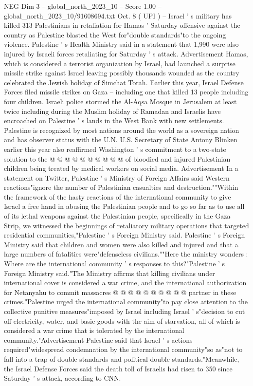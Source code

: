 \begin{textsample}{NEG Dim 3 – global\_north\_2023\_10 – Score 1.00 – global\_north\_2023\_10/91608694.txt}  \label{ex:f3_neg_187}
Oct. 8 ( UPI ) -- Israel ' s military has killed 313 Palestinians in retaliation for Hamas ' Saturday offensive against the country as Palestine blasted the West for"double standards"to the ongoing violence.
Palestine ' s Health Ministry said in a statement that 1,990 were also injured by Israeli forces retaliating for Saturday ' s attack.
Advertisement Hamas, which is considered a terrorist organization by Israel, had launched a surprise missile strike against Israel leaving possibly thousands wounded as the country celebrated the Jewish holiday of Simchat Torah.
Earlier this year, Israel Defense Forces filed missile strikes on Gaza -- including one that killed 13 people including four children.
Israeli police stormed the Al-Aqsa Mosque in Jerusalem at least twice including during the Muslim holiday of Ramadan and Israelis have encroached on Palestine ' s lands in the West Bank with new settlements.
Palestine is recognized by most nations around the world as a sovereign nation and has observer status with the U.N.
U.S.
Secretary of State Antony Blinken earlier this year also reaffirmed Washington ' s commitment to a two-state solution to the @ @ @ @ @ @ @ @ @ @ of bloodied and injured Palestinian children being treated by medical workers on social media.
Advertisement In a statement on Twitter, Palestine ' s Ministry of Foreign Affairs said Western reactions"ignore the number of Palestinian casualties and destruction.""Within the framework of the hasty reactions of the international community to give Israel a free hand in abusing the Palestinian people and to go so far as to use all of its lethal weapons against the Palestinian people, specifically in the Gaza Strip, we witnessed the beginnings of retaliatory military operations that targeted residential communities,"Palestine ' s Foreign Ministry said.
Palestine ' s Foreign Ministry said that children and women were also killed and injured and that a large numbers of fatalities were"defenseless civilians.""Here the ministry wonders : Where are the international community ' s responses to this?"Palestine ' s Foreign Ministry said."The Ministry affirms that killing civilians under international cover is considered a war crime, and the international authorization for Netanyahu to commit massacres @ @ @ @ @ @ @ @ @ @ partner in these crimes."Palestine urged the international community"to pay close attention to the collective punitive measures"imposed by Israel including Israel ' s"decision to cut off electricity, water, and basic goods with the aim of starvation, all of which is considered a war crime that is tolerated by the international community."Advertisement Palestine said that Israel ' s actions required"widespread condemnation by the international community"so as"not to fall into a trap of double standards and political double standards."Meanwhile, the Israel Defense Forces said the death toll of Israelis had risen to 350 since Saturday ' s attack, according to CNN.

\end{textsample}
